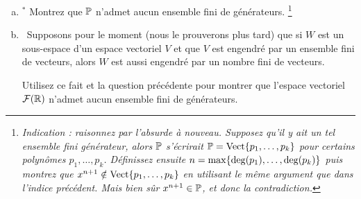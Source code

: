 \begin{prob}
\begin{enumerate}[a)]
\item$^\ast$ Montrez que $\PP$ n'admet aucun ensemble fini de g\'en\'erateurs. \footnote{\it Indication : raisonnez par l'absurde à nouveau. Supposez qu'il y ait un tel ensemble fini générateur, alors $\PP$ s'écrirait $\PP=\sp{p_1, \dots, p_k}$ pour certains polynômes $p_1, \dots, p_k$. Définissez ensuite $n=\max\set{\deg(p_1), \dots, \deg(p_k)}$ puis montrez que $x^{n+1}\notin\sp{p_1, \dots, p_k}$ en utilisant le même argument que dans l'indice précédent. Mais bien sûr $x^{n+1} \in \PP$, et donc la contradiction. }
\medskip

\item\sov~Supposons pour le moment (nous le prouverons plus tard) que si $W$ est un sous-espace d'un espace vectoriel $V$ et que $V$ est engendr\'e par un ensemble fini de vecteurs, alors $W$ est aussi engendré par un nombre fini de vecteurs.

Utilisez ce fait et la question précédente pour montrer que l'espace vectoriel $\F(\R)$ n'admet aucun ensemble fini de g\'en\'erateurs.
\medskip

\end{enumerate}


\end{prob}
